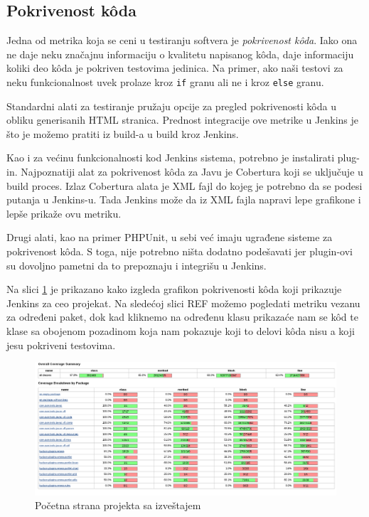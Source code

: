 \subsection{Pokrivenost k\^oda}
Jedna od metrika koja se ceni u testiranju softvera je \textit{pokrivenost k\^oda}. Iako ona ne daje neku značajnu informaciju o kvalitetu napisanog k\^oda, daje informaciju koliki deo k\^oda je pokriven testovima jedinica. Na primer, ako naši testovi za neku funkcionalnost uvek prolaze kroz \verb|if| granu ali ne i kroz \verb|else| granu.

Standardni alati za testiranje pružaju opcije za pregled pokrivenosti k\^oda u obliku generisanih HTML stranica. Prednost integracije ove metrike u Jenkins je što je možemo pratiti iz build-a u build kroz Jenkins. 

Kao i za većinu funkcionalnosti kod Jenkins sistema, potrebno je instalirati plug-in. Najpoznatiji alat za pokrivenost k\^oda za Javu je Cobertura koji se uključuje u build proces. Izlaz Cobertura alata je XML fajl do kojeg je potrebno da se podesi putanja u Jenkins-u. Tada Jenkins može da iz XML fajla napravi lepe grafikone i lepše prikaže ovu metriku.

Drugi alati, kao na primer PHPUnit, u sebi već imaju ugrađene sisteme za pokrivenost k\^oda. S toga, nije potrebno ništa dodatno podešavati jer plugin-ovi su dovoljno pametni da to prepoznaju i integrišu u Jenkins.

Na slici \ref{fig:test_project_coverage} je prikazano kako izgleda grafikon pokrivenosti k\^oda koji prikazuje Jenkins za ceo projekat. Na sledećoj slici REF možemo pogledati metriku vezanu za određeni paket, dok kad kliknemo na određenu klasu prikazaće nam se k\^od te klase sa obojenom pozadinom koja nam pokazuje koji to delovi k\^oda nisu a koji jesu pokriveni testovima.

\begin{figure}
\begin{center}
\includegraphics[scale=0.35]{slike/test_project_coverage.png}
\end{center}
\caption{Početna strana projekta sa izveštajem}
\label{fig:test_project_coverage}
\end{figure}




